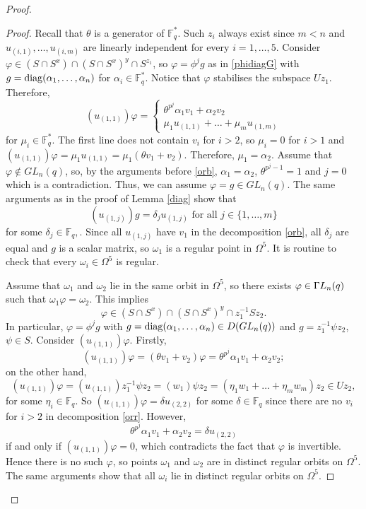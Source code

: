 \begin{proof}
\begin{proof}
Recall that $\theta$ is a generator of $\mathbb{F}_q^*.$ Such $z_i$ always exist since $m<n$ and $u_{(i,1)}, \ldots, u_{(i,m)}$ are linearly independent  for every $i =1 ,\ldots, 5$. 
Consider $\varphi \in (S \cap S^x) \cap (S \cap S^x)^y \cap S^{z_1}$, so $\varphi=\phi^jg$ as in \eqref{phidiagG} with $g=\mathrm{diag}({\alpha_1, \ldots, \alpha_n})$ for $\alpha_i \in \mathbb{F}_q^*.$ Notice that $\varphi$ stabilises the subspace $Uz_1.$ 
Therefore, 
$$(u_{(1,1)})\varphi =
\begin{cases}
 \theta^{p^j} \alpha_1 v_1 + \alpha_2 v_2\\
 \mu_1 u_{(1,1)} + \ldots + \mu_m u_{(1,m)}
\end{cases}
$$ for $\mu_i \in \mathbb{F}_q^*.$ The first line does not contain $v_i$ for $i>2$, so $\mu_i=0$ for $i>1$ and $(u_{(1,1)})\varphi=\mu_1 u_{(1,1)}= \mu_1(\theta v_1 +v_2).$ Therefore, $\mu_1= \alpha_2.$  Assume  that $\varphi \notin GL_n(q)$, so, by the arguments before \eqref{orb}, $\alpha_1 =\alpha_2$,  $\theta^{p^j-1}=1$ and $j=0$ which is a contradiction. Thus, we can assume $\varphi=g \in GL_n(q).$
 The same arguments as in the proof of Lemma \ref{diag} show that $$(u_{(1,j)} )g = \delta_j u_{(1,j)} \text{ for all } j\in \{1,\ldots, m\}$$ for some $\delta_j \in \mathbb{F}_q,$. Since all $u_{(1,j)}$ have $v_1$ in the decomposition \eqref{orb}, all $\delta_j$ are equal and $g$ is a scalar matrix, so $\omega_1$ is a regular point in $\Omega^5.$ It is routine to check that every $\omega_i \in \Omega^5$ is regular. 

Assume that $\omega_1$ and $\omega_2$ lie in the same orbit in $\Omega^5$, so there exists $\varphi \in {{\Gamma L}}_n(q)$ such that $\omega_1 \varphi =\omega_2$. This implies $$\varphi \in (S \cap S^x) \cap (S \cap S^x)^y \cap z_1^{-1}Sz_2.$$
In particular, $\varphi= \phi^j g$ with $g =\mathrm{diag}(\alpha_1, \ldots, \alpha_n) \in D(GL_n(q))$ and $g=z_1^{-1}\psi z_2$, $\psi \in S$. Consider $(u_{(1,1)})\varphi$.  Firstly, 
\begin{equation}\label{orr}
(u_{(1,1)})\varphi=(\theta v_1+v_2)\varphi= \theta^{p^j} \alpha_1 v_1 + \alpha_2 v_2;
\end{equation}
on the other hand,
$$(u_{(1,1)})\varphi =(u_{(1,1)})z_1^{-1}\psi z_2=(w_{1})\psi z_2=(\eta_{1} w_{1} + \ldots +\eta_{m} w_{m})z_2 \in Uz_2,$$
for some $\eta_i \in \mathbb{F}_q$. So $(u_{(1,1)})\varphi= \delta u_{(2,2)}$ for some $\delta \in \mathbb{F}_q$ since there are no $v_i$ for $i>2$ in decomposition \eqref{orr}. However, 
$$\theta^{p^j} \alpha_1 v_1 + \alpha_2 v_2=\delta u_{(2,2)}$$
if and only if $(u_{(1,1)})\varphi=0$, which contradicts the fact that $\varphi$ is invertible. Hence  there is no such $\varphi$, so points $\omega_1$ and $\omega_2$ are in  distinct regular orbits on $\Omega^5.$ The same arguments show that all $\omega_i$ lie in  distinct regular orbits on $\Omega^5.$   


\end{proof}
\end{proof}
